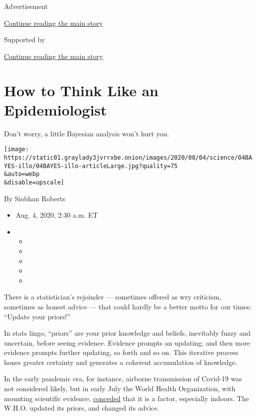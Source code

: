 Advertisement

\protect\hyperlink{after-top}{Continue reading the main story}

Supported by

\protect\hyperlink{after-sponsor}{Continue reading the main story}

\hypertarget{how-to-think-like-an-epidemiologist}{%
\section{How to Think Like an
Epidemiologist}\label{how-to-think-like-an-epidemiologist}}

Don't worry, a little Bayesian analysis won't hurt you.

\texttt{[image: https://static01.graylady3jvrrxbe.onion/images/2020/08/04/science/04BAYES-illo/04BAYES-illo-articleLarge.jpg?quality=75\\\&auto=webp\\\&disable=upscale]}

By Siobhan Roberts

\begin{itemize}
\item
  Aug. 4, 2020, 2:30 a.m. ET
\item
  \begin{itemize}
  \item
  \item
  \item
  \item
  \item
  \end{itemize}
\end{itemize}

There is a statistician's rejoinder --- sometimes offered as wry
criticism, sometimes as honest advice --- that could hardly be a better
motto for our times: ``Update your priors!''

In stats lingo, ``priors'' are your prior knowledge and beliefs,
inevitably fuzzy and uncertain, before seeing evidence. Evidence prompts
an updating; and then more evidence prompts further updating, so forth
and so on. This iterative process hones greater certainty and generates
a coherent accumulation of knowledge.

In the early pandemic era, for instance, airborne transmission of
Covid-19 was not considered likely, but in early July the World Health
Organization, with mounting scientific evidence,
\href{https://www.nytimes3xbfgragh.onion/2020/07/30/opinion/coronavirus-aerosols.html?surface=most-popular\&fellback=false\&req_id=877412152\&algo=top_conversion\&imp_id=115726583\&action=click\&module=Most\%20Popular\&pgtype=Homepage}{conceded}
that it is a factor, especially indoors. The W.H.O. updated its priors,
and changed its advice.

